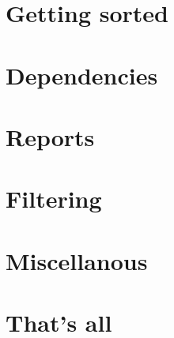 \documentclass[t,handout]{beamer}
\begin{document}
\section{Getting sorted}


\section{Dependencies}


\section{Reports}


\section{Filtering}


\section{Miscellanous}


\section{That's all}

\end{document}
